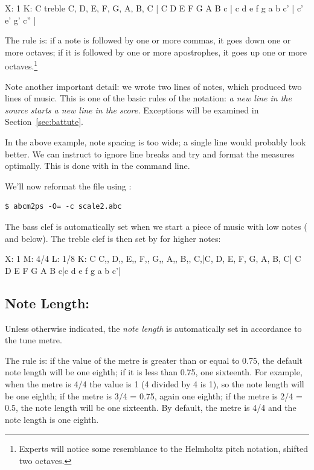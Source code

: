 \documentclass[a4paper,12pt]{book}
\begin{document}
\begin{abcsource}
X: 1
K: C treble
C, D, E, F, G, A, B, C | C D E F G A B c |
c d e f g a b c' | c' e' g' c'' |
\end{abcsource}


The rule is: if a note is followed by one or more commas, it goes down
one or more octaves; if it is followed by one or more apostrophes, it
goes up one or more octaves.\footnote{Experts will notice some
resemblance to the Helmholtz pitch notation, shifted two octaves.} 

Note another important detail: we wrote two lines of \ABC{} notes,
which produced two lines of music. This is one of the basic rules of
the \ABC{} notation: \emph{a new line in the source starts a new
line in the score.} Exceptions will be examined in
Section~\ref{sec:battute}.

In the above example, note spacing is too wide; a single line would
probably look better. We can instruct \abcm{} to ignore line breaks
and try and format the measures optimally. This is done with 
in the command line.

We'll now reformat the file using :

\begin{verbatim}
$ abcm2ps -O= -c scale2.abc
\end{verbatim}



The bass clef is automatically set when we start a piece of music with
low notes ( and below). The treble clef is then set by \abcm{}
for higher notes:

\begin{abcsource}
X: 1
M: 4/4
L: 1/8
K: C
%
C,, D,, E,, F,, G,, A,, B,, C,|C, D, E, F, G, A, B, C|
C D E F G A B c|c d e f g a b c'|
\end{abcsource}



\subsection{Note Length: }
\label{sec:length}

Unless otherwise indicated, the \emph{note length} is automatically
set in accordance to the tune metre.

The rule is: if the value of the metre is greater than or equal to
0.75, the default note length will be one eighth; if it is less than
0.75, one sixteenth. For example, when the metre is 4/4 the value is 1
(4 divided by 4 is 1), so the note length will be one eighth; if the
metre is 3/4 = 0.75, again one eighth; if the metre is 2/4 = 0.5, the
note length will be one sixteenth. By default, the metre is 4/4 and
the note length is one eighth.
\end{document}
